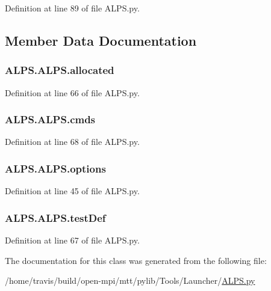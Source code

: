 Definition at line 89 of file A\-L\-P\-S.\-py.



\subsection{Member Data Documentation}
\hypertarget{classALPS_1_1ALPS_ac371dce53e8c120f7031259025562bdb}{
\subsubsection[{allocated}]{\setlength{\rightskip}{0pt plus 5cm}A\-L\-P\-S.\-A\-L\-P\-S.\-allocated}}\label{classALPS_1_1ALPS_ac371dce53e8c120f7031259025562bdb}


Definition at line 66 of file A\-L\-P\-S.\-py.

\hypertarget{classALPS_1_1ALPS_a64bae95ba692ef4df06f716692b50ee9}{
\subsubsection[{cmds}]{\setlength{\rightskip}{0pt plus 5cm}A\-L\-P\-S.\-A\-L\-P\-S.\-cmds}}\label{classALPS_1_1ALPS_a64bae95ba692ef4df06f716692b50ee9}


Definition at line 68 of file A\-L\-P\-S.\-py.

\hypertarget{classALPS_1_1ALPS_a24dfa9b508f507c4cb6148f10a081555}{
\subsubsection[{options}]{\setlength{\rightskip}{0pt plus 5cm}A\-L\-P\-S.\-A\-L\-P\-S.\-options}}\label{classALPS_1_1ALPS_a24dfa9b508f507c4cb6148f10a081555}


Definition at line 45 of file A\-L\-P\-S.\-py.

\hypertarget{classALPS_1_1ALPS_a839c4f84a46683221d51004c08345ff2}{
\subsubsection[{test\-Def}]{\setlength{\rightskip}{0pt plus 5cm}A\-L\-P\-S.\-A\-L\-P\-S.\-test\-Def}}\label{classALPS_1_1ALPS_a839c4f84a46683221d51004c08345ff2}


Definition at line 67 of file A\-L\-P\-S.\-py.



The documentation for this class was generated from the following file\-:\begin{DoxyCompactItemize}
\item 
/home/travis/build/open-\/mpi/mtt/pylib/\-Tools/\-Launcher/\hyperlink{ALPS_8py}{A\-L\-P\-S.\-py}\end{DoxyCompactItemize}
